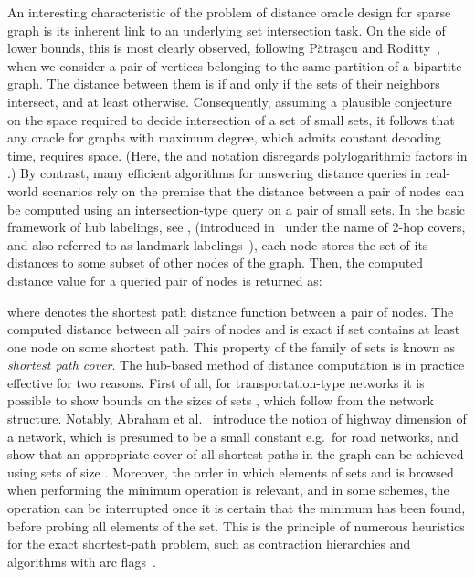 \documentclass{article}[11pt,letter]
\begin{document}
An interesting characteristic of the problem of distance oracle design for sparse graph is its inherent link to an underlying set intersection task. On the side of lower bounds, this is most clearly observed, following Pătraşcu and Roditty~\cite{PatrascuR14}, when we consider a pair of vertices belonging to the same partition of a bipartite graph. The distance between them is  if and only if the sets of their neighbors intersect, and at least  otherwise. Consequently, assuming a plausible conjecture on the space required to decide intersection of a set of small sets, it follows that any oracle for graphs with  maximum degree, which admits constant decoding time, requires  space. (Here, the  and  notation disregards polylogarithmic factors in .) By contrast, many efficient algorithms for answering distance queries in real-world scenarios rely on the premise that the distance between a pair of nodes can be computed using an intersection-type query on a pair of small sets. In the basic framework of hub labelings, see \cite{Abraham:2012:HHL:2404160.2404164}, (introduced in~\cite{Cohen:2003:RDQ:942270.944300} under the name of 2-hop covers, and also referred to as landmark labelings~\cite{Abraham11onapproximate}), each node  stores the set of its distances to some subset  of other nodes of the graph. Then, the computed distance value  for a queried pair of nodes  is returned as:

where  denotes the shortest path distance function between a pair of nodes. The computed distance between all pairs of nodes  and  is exact if set  contains at least one node on some shortest  path. This property of the family of sets  is known as \emph{shortest path cover}. The hub-based method of distance computation is in practice effective for two reasons. First of all, for transportation-type networks it is possible to show bounds on the sizes of sets , which follow from the network structure. Notably, Abraham et al.~\cite{doi:10.1137/1.9781611973075.64} introduce the notion of highway dimension  of a network, which is presumed to be a small constant e.g.\ for road networks, and show that an appropriate cover of all shortest paths in the graph can be achieved using sets  of size . Moreover, the order in which elements of sets  and  is browsed when performing the minimum operation is relevant, and in some schemes, the operation can be interrupted once it is certain that the minimum has been found, before probing all elements of the set. This is the principle of numerous heuristics for the exact shortest-path problem, such as contraction hierarchies and algorithms with arc flags~\cite{Kohler06fastpoint-to-point,Bauer:2010:SFR:1498698.1537599}.
\end{document}
